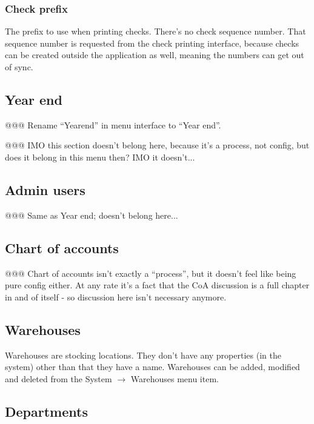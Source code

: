 \subsubsection{Check prefix}
\label{subsubsec-company-config-defaults-check-prefix}

 The prefix to use when printing checks. There's no check sequence number. That sequence number is requested from the check printing interface, because
checks can be created outside the application as well, meaning the numbers can
get out of sync.

\subsection{Year end}
\label{subsec-company-config-year-end}

@@@ Rename ``Yearend'' in menu interface to ``Year end''.


@@@ IMO this section doesn't belong here, because it's a process, not config, but does it belong in this menu then? IMO it doesn't...


\subsection{Admin users}
\label{subsec-company-config-admin-users}

@@@ Same as Year end; doesn't belong here...

\subsection{Chart of accounts}
\label{subsec-company-config-coa}

@@@ Chart of accounts isn't exactly a ``process'', but it doesn't feel like being pure
config either. At any rate it's a fact that the CoA discussion is a full chapter in and
of itself - so discussion here isn't necessary anymore.

\subsection{Warehouses}
\label{subsec-company-config-warehouses}

Warehouses are stocking locations. They don't have any properties (in the system)
other than that they have a name. Warehouses can be added, modified and deleted from
the System $\rightarrow$ Warehouses menu item.

\subsection{Departments}
\label{subsec-company-config-departments}

